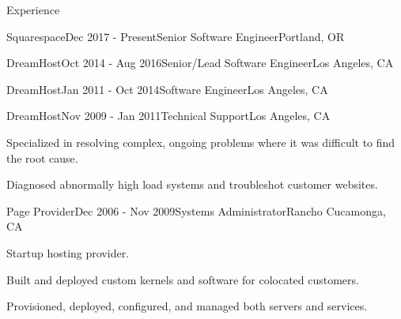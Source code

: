 \documentclass{resume} %
\begin{document}
\begin{rSection}{Experience}

\begin{rSubsection}{Squarespace}{Dec 2017 - Present}{Senior Software Engineer}{Portland, OR}
\end{rSubsection}


\begin{rSubsection}{DreamHost}{Oct 2014 - Aug 2016}{Senior/Lead Software Engineer}{Los Angeles, CA}
\end{rSubsection}


\begin{rSubsection}{DreamHost}{Jan 2011 - Oct 2014}{Software Engineer}{Los Angeles, CA}
\end{rSubsection}


\begin{rSubsection}{DreamHost}{Nov 2009 - Jan 2011}{Technical Support}{Los Angeles, CA}
\item Specialized in resolving complex, ongoing problems where it was difficult to find the root cause.
\item Diagnosed abnormally high load systems and troubleshot customer websites.
\end{rSubsection}


\begin{rSubsection}{Page Provider}{Dec 2006 - Nov 2009}{Systems Administrator}{Rancho Cucamonga, CA}
\item Startup hosting provider.
\item Built and deployed custom kernels and software for colocated customers.
\item Provisioned, deployed, configured, and managed both servers and services.
\end{rSubsection}

\end{rSection}

\end{document}

